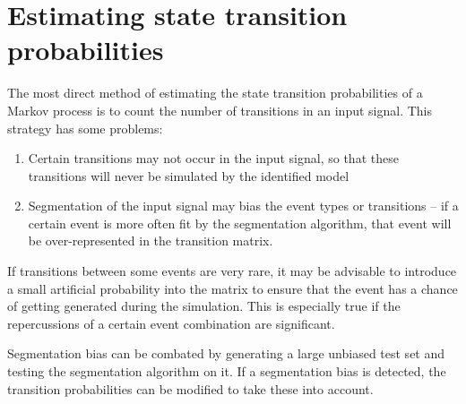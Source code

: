 \section{Estimating state transition probabilities}
The most direct method of estimating the state transition
probabilities of a Markov process is to count the number of
transitions in an input signal.  This strategy has some problems:
\begin{enumerate}
\item Certain transitions may not occur in the input signal, so that
  these transitions will never be simulated by the identified model
\item Segmentation of the input signal may bias the event types or
  transitions -- if a certain event is more often fit by the
  segmentation algorithm, that event will be over-represented in the
  transition matrix.
\end{enumerate}

If transitions between some events are very rare, it may be advisable
to introduce a small artificial probability into the matrix to ensure
that the event has a chance of  getting generated during the
simulation.  This is especially true if the repercussions of a certain
event combination are significant.  

Segmentation bias can be combated by generating a large unbiased test
set and testing the segmentation algorithm on it.  If a segmentation
bias is detected, the transition probabilities can be modified to take
these into account.




